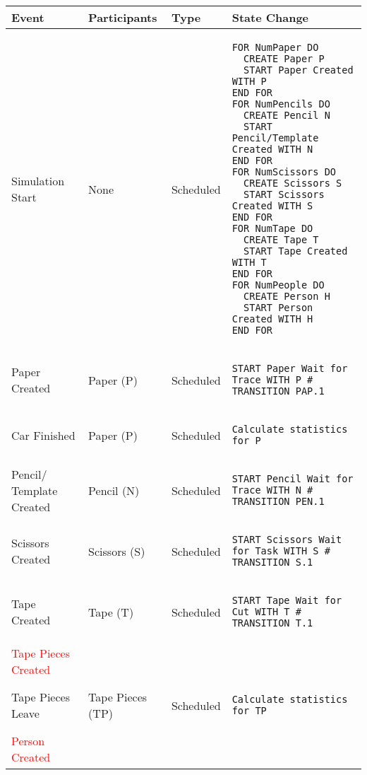 \begin{longtable}{@{}>{\raggedright\arraybackslash}p{1.5cm}>{\raggedright\arraybackslash}p{2.1cm}>{\raggedright\arraybackslash}p{2.2cm}>{\raggedright\arraybackslash}p{10cm}@{}}
  \toprule
  Event          & Participants & Type       & State Change \\ \midrule
  \endhead
  Simulation Start & None  & Scheduled  & 
  \begin{lstlisting}[language=CMPseudo]
FOR NumPaper DO
  CREATE Paper P
  START Paper Created WITH P
END FOR
FOR NumPencils DO
  CREATE Pencil N
  START Pencil/Template Created WITH N
END FOR
FOR NumScissors DO
  CREATE Scissors S
  START Scissors Created WITH S
END FOR
FOR NumTape DO
  CREATE Tape T
  START Tape Created WITH T
END FOR
FOR NumPeople DO
  CREATE Person H
  START Person Created WITH H
END FOR
  \end{lstlisting}
  \\ \midrule
  Paper Created & Paper (P)  & Scheduled  & 
  \begin{lstlisting}[language=CMPseudo]
START Paper Wait for Trace WITH P # TRANSITION PAP.1
  \end{lstlisting}
  \\ \midrule
  Car Finished & Paper (P)  & Scheduled  & 
  \begin{lstlisting}[language=CMPseudo]
Calculate statistics for P
  \end{lstlisting}
  \\ \midrule
  Pencil/ Template Created & Pencil (N)  & Scheduled  & 
  \begin{lstlisting}[language=CMPseudo]
START Pencil Wait for Trace WITH N # TRANSITION PEN.1
  \end{lstlisting}
  \\ \midrule
  Scissors Created & Scissors (S)  & Scheduled  & 
  \begin{lstlisting}[language=CMPseudo]
START Scissors Wait for Task WITH S # TRANSITION S.1
  \end{lstlisting}
  \\ \midrule
  Tape Created & Tape (T)  & Scheduled  & 
  \begin{lstlisting}[language=CMPseudo]
START Tape Wait for Cut WITH T # TRANSITION T.1
  \end{lstlisting}
  \\ \midrule
  \textcolor{Red}{Tape Pieces Created} &   &  & 
  \begin{lstlisting}[language=CMPseudo]
  
  \end{lstlisting}
  \\ \midrule
Tape Pieces Leave & Tape Pieces (TP)  & Scheduled  & 
  \begin{lstlisting}[language=CMPseudo]
Calculate statistics for TP
  \end{lstlisting}
  \\ \midrule
  \textcolor{Red}{Person Created} &  &   & 
  \begin{lstlisting}[language=CMPseudo]
 

\end{lstlisting}
\end{longtable}

